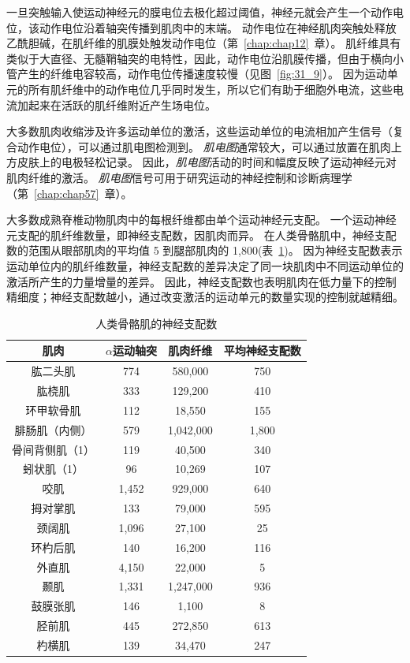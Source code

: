 一旦突触输入使运动神经元的膜电位去极化超过阈值，神经元就会产生一个动作电位，该动作电位沿着轴突传播到肌肉中的末端。
动作电位在神经肌肉突触处释放乙酰胆碱，在肌纤维的肌膜处触发动作电位（第~\ref{chap:chap12}~章）。
肌纤维具有类似于大直径、无髓鞘轴突的电特性，因此，动作电位沿肌膜传播，但由于横向小管产生的纤维电容较高，动作电位传播速度较慢（见图~\ref{fig:31_9}）。
因为运动单元的所有肌纤维中的动作电位几乎同时发生，所以它们有助于细胞外电流，这些电流加起来在活跃的肌纤维附近产生场电位。


大多数肌肉收缩涉及许多运动单位的激活，这些运动单位的电流相加产生信号（复合动作电位），可以通过肌电图检测到。
\textit{肌电图}通常较大，可以通过放置在肌肉上方皮肤上的电极轻松记录。
因此，\textit{肌电图}活动的时间和幅度反映了运动神经元对肌肉纤维的激活。
\textit{肌电图}信号可用于研究运动的神经控制和诊断病理学（第~\ref{chap:chap57}~章）。


大多数成熟脊椎动物肌肉中的每根纤维都由单个运动神经元支配。
一个运动神经元支配的肌纤维数量，即神经支配数，因肌肉而异。
在人类骨骼肌中，神经支配数的范围从眼部肌肉的平均值 5 到腿部肌肉的 1,800(表~\ref{tab:31_1})。
因为神经支配数表示运动单位内的肌纤维数量，神经支配数的差异决定了同一块肌肉中不同运动单位的激活所产生的力量增量的差异。
因此，神经支配数也表明肌肉在低力量下的控制精细度；神经支配数越小，通过改变激活的运动单元的数量实现的控制就越精细。


\begin{table}[htbp]
	\caption{人类骨骼肌的神经支配数\label{tab:31_1}}
	\centering
	\begin{tabular}{cccc}
		\toprule
		肌肉 & $ \alpha $运动轴突 & 肌肉纤维 & 平均神经支配数\\
		\midrule
		肱二头肌 & 774  & 580,000 & 750 \\
		肱桡肌 & 333  & 129,200 & 410 \\
		环甲软骨肌 & 112  & 18,550 & 155 \\
		腓肠肌（内侧） & 579  & 1,042,000 & 1,800 \\
		骨间背侧肌（1） & 119  & 40,500 & 340 \\
		蚓状肌（1） & 96  & 10,269 & 107 \\
		咬肌 & 1,452  & 929,000 & 640 \\
		拇对掌肌 & 133  & 79,000 & 595 \\
		颈阔肌 & 1,096  & 27,100 & 25 \\
		环杓后肌 & 140  & 16,200 & 116 \\
		外直肌 & 4,150  & 22,000 & 5 \\
		颞肌 & 1,331  & 1,247,000 & 936 \\
		鼓膜张肌 & 146  & 1,100 & 8 \\
		胫前肌 & 445  & 272,850 & 613 \\
		杓横肌 & 139  & 34,470 & 247 \\
		\bottomrule
	\end{tabular}
\end{table}


